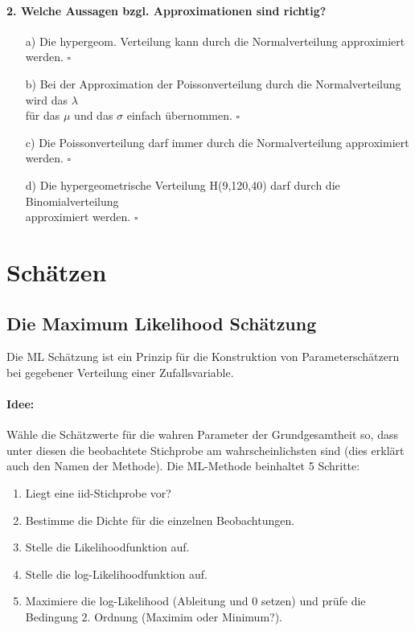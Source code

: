 \documentclass[a4paper]{article}
\begin{document}
\paragraph{2. Welche Aussagen bzgl. Approximationen sind richtig?}
\begin{itemize}
    \item[a)] Die hypergeom. Verteilung kann durch die Normalverteilung approximiert werden. \hfill $\square$
    \item[b)] Bei der Approximation der Poissonverteilung durch die Normalverteilung wird das $\lambda$\\ für das $\mu$ und das $\sigma$ einfach übernommen. \hfill $\square$
    \item[c)] Die Poissonverteilung darf immer durch die Normalverteilung approximiert werden. \hfill $\square$
    \item[d)] Die hypergeometrische Verteilung H(9,120,40) darf durch die Binomialverteilung \\approximiert werden. \hfill $\square$
\end{itemize}


\clearpage


\section{Schätzen}\label{chap:schaetzen}

\subsection{Die Maximum Likelihood Schätzung}\label{sec:ML}

Die ML Schätzung ist ein Prinzip für die Konstruktion von Parameterschätzern bei gegebener Verteilung einer Zufallsvariable.\\

\paragraph{Idee:} Wähle die Schätzwerte für die wahren Parameter der Grundgesamtheit so, dass unter diesen die beobachtete Stichprobe am wahrscheinlichsten sind (dies erklärt auch den Namen der Methode). Die ML-Methode beinhaltet 5 Schritte:

\begin{enumerate}
    \item Liegt eine iid-Stichprobe vor?
    \item Bestimme die Dichte für die einzelnen Beobachtungen.
    \item Stelle die Likelihoodfunktion auf.
    \item Stelle die log-Likelihoodfunktion auf.
    \item Maximiere die log-Likelihood (Ableitung und 0 setzen) und prüfe die Bedingung 2. Ordnung (Maximim oder Minimum?).
\end{enumerate}
\end{document}
